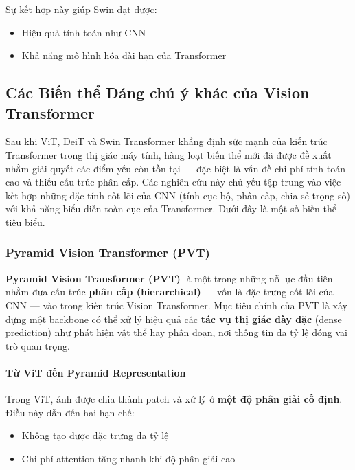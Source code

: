 Sự kết hợp này giúp Swin đạt được:
\begin{itemize}
	\item Hiệu quả tính toán như CNN
	\item Khả năng mô hình hóa dài hạn của Transformer
\end{itemize}

\subsection{Các Biến thể Đáng chú ý khác của Vision Transformer}
\label{subsec:other_vit_variants}

Sau khi ViT, DeiT và Swin Transformer khẳng định sức mạnh của kiến trúc Transformer trong thị giác máy tính, hàng loạt biến thể mới đã được đề xuất nhằm giải quyết các điểm yếu còn tồn tại — đặc biệt là vấn đề chi phí tính toán cao và thiếu cấu trúc phân cấp.  
Các nghiên cứu này chủ yếu tập trung vào việc kết hợp những đặc tính cốt lõi của CNN (tính cục bộ, phân cấp, chia sẻ trọng số) với khả năng biểu diễn toàn cục của Transformer.  
Dưới đây là một số biến thể tiêu biểu.

\subsubsection{Pyramid Vision Transformer (PVT)}
\label{subsubsec:pvt}

\textbf{Pyramid Vision Transformer (PVT)} \cite{Wang2021} là một trong những nỗ lực đầu tiên nhằm đưa cấu trúc \textbf{phân cấp (hierarchical)} — vốn là đặc trưng cốt lõi của CNN — vào trong kiến trúc Vision Transformer.  
Mục tiêu chính của PVT là xây dựng một backbone có thể xử lý hiệu quả các \textbf{tác vụ thị giác dày đặc} (dense prediction) như phát hiện vật thể hay phân đoạn, nơi thông tin đa tỷ lệ đóng vai trò quan trọng.

\paragraph{Từ ViT đến Pyramid Representation}

Trong ViT, ảnh được chia thành patch và xử lý ở \textbf{một độ phân giải cố định}. Điều này dẫn đến hai hạn chế:
\begin{itemize}
	\item Không tạo được đặc trưng đa tỷ lệ
	\item Chi phí attention tăng nhanh khi độ phân giải cao
\end{itemize}

